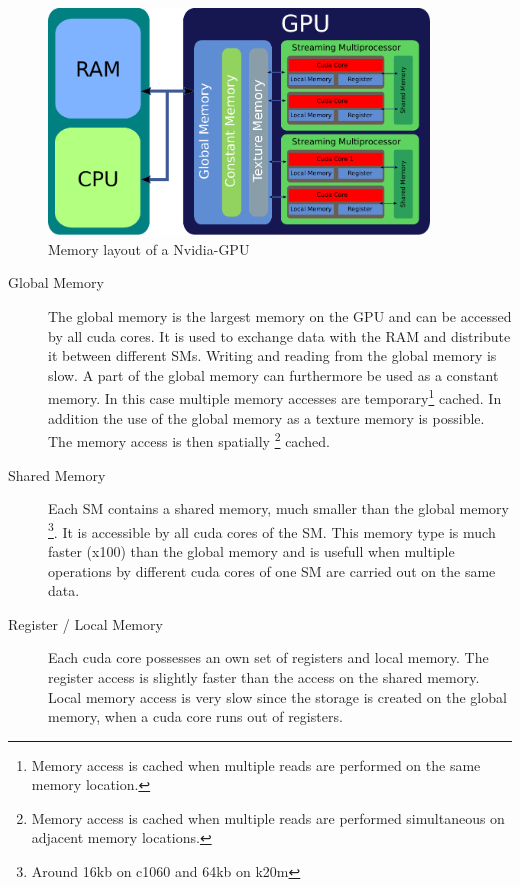 \begin{figure}[!tbp]
      \centering
        \includegraphics[width=0.9\textwidth]{gfx/cuda/gpu.pdf}
          \caption{Memory layout of a Nvidia-GPU}
    \label{fig:gpu_memory_layout}
\end{figure}

\begin{description}
    \item[Global Memory] The global memory is the largest memory on the GPU and can be accessed by all cuda cores.
                         It is  used to exchange data with the RAM and distribute it between different SMs.
                         Writing and reading from the global memory is slow. A part of the global memory can furthermore be used as a constant memory.
                         In this case multiple memory accesses  are temporary\footnote{Memory access is cached when multiple reads are performed on the same memory location.}
                          cached.
                         In addition the use of the global memory as a texture memory is possible. The memory access is then spatially
                         \footnote{Memory access is cached when multiple reads are performed simultaneous on adjacent memory locations.} cached.

    \item[Shared Memory] Each SM contains a shared memory, much smaller than the global memory \footnote{Around 16kb on c1060 and 64kb on k20m}. It is accessible
                         by all cuda cores of the SM.
                         This memory type is much faster (x100) than the global memory and is usefull when multiple operations
                         by different cuda cores of one SM are carried out on the same data.

    \item[Register / Local Memory] Each cuda core possesses an own set of registers and local memory.
                                   The register access is slightly faster than the access  on the shared memory.
                                   Local memory access is very slow since the storage is
                                    created on the global memory, when a cuda core runs out of registers.
\end{description}

